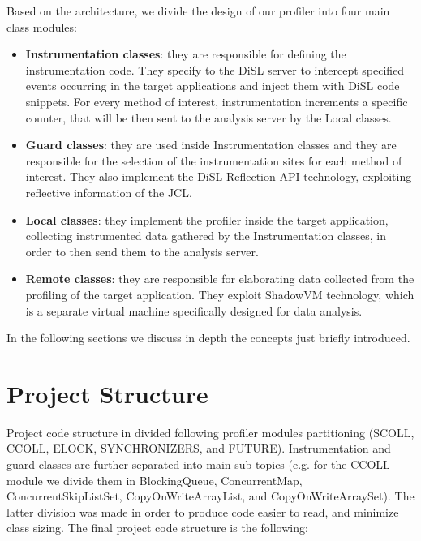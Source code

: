 \documentclass[]{usiinfthesis}
\begin{document}
\noindent
Based on the architecture, we divide the design of our profiler into four main class modules:
\begin{itemize}
    \item \textbf{Instrumentation classes}: they are responsible for defining the instrumentation code. They specify to the DiSL server to intercept specified events occurring in the target applications and inject them with DiSL code snippets. For every method of interest, instrumentation increments a specific counter, that will be then sent to the analysis server by the Local classes.
    \item \textbf{Guard classes}: they are used inside Instrumentation classes and they are responsible for the selection of the instrumentation sites for each method of interest. They also implement the DiSL Reflection API technology, exploiting reflective information of the JCL.
    \item \textbf{Local classes}: they implement the profiler inside the target application, collecting instrumented data gathered by the Instrumentation classes, in order to then send them to the analysis server.
    \item \textbf{Remote classes}: they are responsible for elaborating data collected from the profiling of the target application. They exploit ShadowVM technology, which is a separate virtual machine specifically designed for data analysis.
\end{itemize}
In the following sections we discuss in depth the concepts just briefly introduced. 


\section{Project Structure} \label{sec:5.2}

Project code structure in divided following profiler modules partitioning (SCOLL, CCOLL, ELOCK, SYNCHRONIZERS, and FUTURE). Instrumentation and guard classes are further separated into main sub-topics (e.g. for the CCOLL module we divide them in BlockingQueue, ConcurrentMap, ConcurrentSkipListSet, CopyOnWriteArrayList, and CopyOnWriteArraySet). The latter division was made in order to produce code easier to read, and minimize class sizing. The final project code structure is the following:
\end{document}
